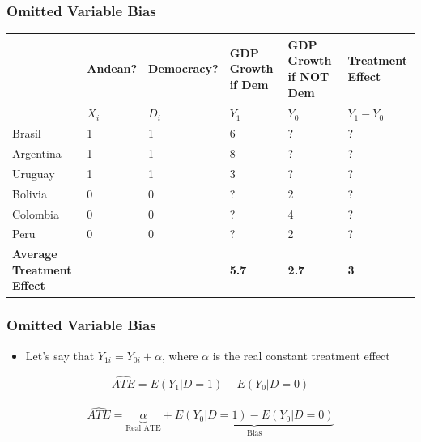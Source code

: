 \documentclass[xcolor=x11names,compress]{beamer}\usepackage[]{graphicx}\usepackage[]{xcolor}
\renewcommand{\(}{\begin{columns}}
\renewcommand{\)}{\end{columns}}
\newcommand{\<}[1]{\begin{column}{#1}}
\renewcommand{\>}{\end{column}}
\begin{document}
\begin{frame}
\frametitle{Omitted Variable Bias}
\scriptsize
\begin{table}[htbp]
  \centering
    \begin{tabular}{|p{1.6cm}|p{1.6cm}|p{1.6cm}|p{1.6cm}|p{1.6cm}|p{1.6cm}|}
    \hline
           & \multicolumn{1}{|p{1.6cm}|}{Andean?} & \multicolumn{1}{|p{1.6cm}|}{Democracy?} & \multicolumn{1}{p{1.6cm}|}{GDP Growth if Dem} & \multicolumn{1}{p{1.6cm}|}{GDP Growth if NOT Dem} & \textbf{Treatment Effect} \bigstrut\\
    \hline
          & \multicolumn{1}{|p{1.6cm}|}{$X_i$} & \multicolumn{1}{p{1.6cm}|}{$D_i$} & \multicolumn{1}{p{1.6cm}|}{$Y_1$} & \multicolumn{1}{p{1.6cm}|}{$Y_0$} & \multicolumn{1}{p{1.6cm}|}{$Y_{1} - Y_{0}$} \bigstrut\\
    \hline
    Brasil & 1 & 1 & 6     & ?     & ? \bigstrut\\
    \hline
    Argentina & 1 & 1 & 8    & ?     & ? \bigstrut\\
    \hline
    Uruguay & 1 & 1 & 3 & ? & ?  \bigstrut\\
    \hline
    Bolivia & 0 & 0 & ?     & 2     & ? \bigstrut\\
    \hline
    Colombia & 0 & 0 & ?    & 4    & ? \bigstrut\\
    \hline
    Peru & 0 & 0 & ?     & 2     & ? \bigstrut\\
    \hline
    \textbf{Average Treatment Effect}& & & \textbf{5.7} & \textbf{2.7} & \textbf{3} \bigstrut\\
    \hline
    \end{tabular}%
  \label{tab:addlabel}%
\end{table}%
\normalsize
\end{frame}


\begin{frame}
\frametitle{Omitted Variable Bias}
\begin{itemize}
\item Let's say that $Y_{1i} = Y_{0i} + \alpha$, where $\alpha$ is the real constant treatment effect
\end{itemize}
$$ \hat{ATE} = E(Y_1|D=1) - E(Y_0|D=0)$$ \\ \pause
$$ \hat{ATE} = \underbrace{\alpha}_\text{Real ATE} + \underbrace{E(Y_0|D=1) - E(Y_0|D=0)}_\text{Bias}$$ \\
\end{frame}
\end{document}
